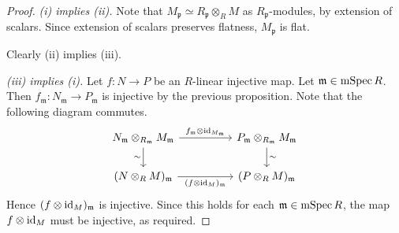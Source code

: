 \begin{proof}
    \emph{(i) implies (ii).}
    Note that \( M_{\mathfrak p} \simeq R_{\mathfrak p} \otimes_R M \) as \( R_{\mathfrak p} \)-modules, by extension of scalars.
    Since extension of scalars preserves flatness, \( M_{\mathfrak p} \) is flat.

    Clearly (ii) implies (iii).

    \emph{(iii) implies (i).}
    Let \( f : N \to P \) be an \( R \)-linear injective map.
    Let \( \mathfrak m \in \operatorname{mSpec} R \).
    Then \( f_{\mathfrak m} : N_{\mathfrak m} \to P_{\mathfrak m} \) is injective by the previous proposition.
    Note that the following diagram commutes.
\[\begin{tikzcd}[column sep=huge]
	{N_{\mathfrak m} \otimes_{R_{\mathfrak m}} M_{\mathfrak m}} & {P_{\mathfrak m} \otimes_{R_{\mathfrak m}} M_{\mathfrak m}} \\
	{(N \otimes_R M)_{\mathfrak m}} & {(P \otimes_R M)_{\mathfrak m}}
	\arrow["{f_{\mathfrak m} \otimes \id_{M_{\mathfrak m}}}", from=1-1, to=1-2]
	\arrow["\sim", from=1-2, to=2-2]
	\arrow["\sim"', from=1-1, to=2-1]
	\arrow["{(f \otimes \id_M)_{\mathfrak m}}"', from=2-1, to=2-2]
\end{tikzcd}\]
    Hence \( (f \otimes \operatorname{id}_M)_{\mathfrak m} \) is injective.
    Since this holds for each \( \mathfrak m \in \operatorname{mSpec} R \), the map \( f \otimes \operatorname{id}_M \) must be injective, as required.
\end{proof}
